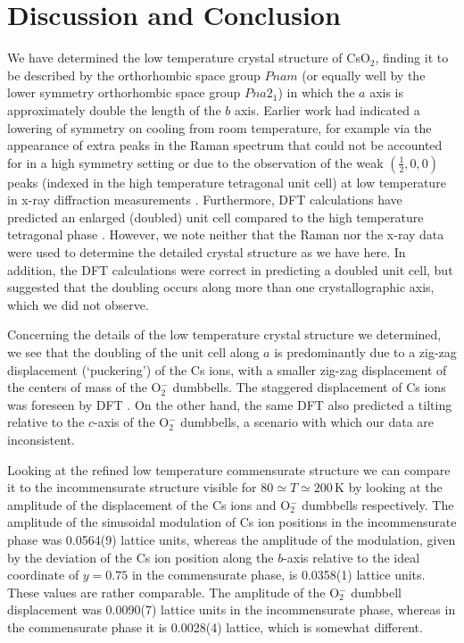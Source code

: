 \documentclass[prb,aps,twocolumn,superscriptaddress,showpacs,footinbib]{revtex4-2}
\begin{document}
\section{Discussion and Conclusion}\label{sec:discussion}

We have determined the low temperature crystal structure of CsO$_{2}$, finding it to be described by the orthorhombic space group $Pnam$ (or equally well by the lower symmetry orthorhombic space group $Pna2_{1}$) in which the $a$ axis is approximately double the length of the $b$ axis. Earlier work had indicated a lowering of symmetry on cooling from room temperature, for example via the appearance of extra peaks in the Raman spectrum that could not be accounted for in a high symmetry setting \cite{Riyadi2012} or due to the observation of the weak $(\frac{1}{2},0,0)$ peaks (indexed in the high temperature tetragonal unit cell) at low temperature in x-ray diffraction measurements \cite{Ziegler1976}. Furthermore, DFT calculations have predicted an enlarged (doubled) unit cell compared to the high temperature tetragonal phase \cite{Riyadi2012}. However, we note neither that the Raman nor the x-ray data were used to determine the detailed crystal structure as we have here. In addition, the DFT calculations were correct in predicting a doubled unit cell, but suggested that the doubling occurs along more than one crystallographic axis, which we did not observe.

Concerning the details of the low temperature crystal structure we determined, we see that the doubling of the unit cell along $a$ is predominantly due to a zig-zag displacement (`puckering') of the Cs ions, with a smaller zig-zag displacement of the centers of mass of the O$_{2}^{-}$ dumbbells. The staggered displacement of Cs ions was foreseen by DFT \cite{Riyadi2012}. On the other hand, the same DFT also predicted a tilting relative to the $c$-axis of the O$_{2}^{-}$ dumbbells, a scenario with which our data are inconsistent.

Looking at the refined low temperature commensurate structure we can compare it to the incommensurate structure visible for $80 \simeq T \simeq 200$\,K by looking at the amplitude of the displacement of the Cs ions and O$_{2}^{-}$ dumbbells respectively. The amplitude of the sinusoidal modulation of Cs ion positions in the incommensurate phase was 0.0564(9) lattice units, whereas the amplitude of the modulation, given by the deviation of the Cs ion position along the $b$-axis relative to the ideal coordinate of $y=0.75$ in the commensurate phase, is 0.0358(1) lattice units. These values are rather comparable. The amplitude of the O$_{2}^{-}$ dumbbell displacement was 0.0090(7) lattice units in the incommensurate phase, whereas in the commensurate phase it is 0.0028(4) lattice, which is somewhat different.
\end{document}
